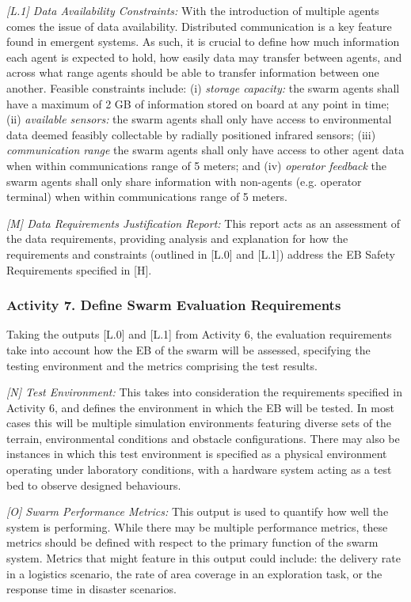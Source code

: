 \documentclass[runningheads]{llncs}
\begin{document}
\emph{[L.1] Data Availability Constraints:}
With the introduction of multiple agents comes the issue of data availability. Distributed communication is a key feature found in emergent systems. As such, it is crucial to define how much information each agent is expected to hold, how easily data may transfer between agents, and across what range agents should be able to transfer information between one another. Feasible constraints include: (i) \emph{storage capacity: }the swarm agents shall have a maximum of 2 GB of information stored on board at any point in time; (ii) \emph{available sensors:} the swarm agents shall only have access to environmental data deemed feasibly collectable by radially positioned infrared sensors; (iii) \emph{communication range} the swarm agents shall only have access to other agent data when within communications range of 5 meters; and (iv) \emph{operator feedback} the swarm agents shall only share information with non-agents (e.g. operator terminal) when within communications range of 5 meters.

\emph{[M] Data Requirements Justification Report:}
This report acts as an assessment of the data requirements, providing analysis and explanation for how the requirements and constraints (outlined in [L.0] and [L.1]) address the EB Safety Requirements specified in [H].

\subsubsection*{Activity 7. Define Swarm Evaluation Requirements}

Taking the outputs [L.0] and [L.1] from Activity 6, the evaluation requirements take into account how the EB of the swarm will be assessed, specifying the testing environment and the metrics comprising the test results.  

\emph{[N] Test Environment:} This takes into consideration the requirements specified in Activity 6, and defines the environment in which the EB will be tested. In most cases this will be multiple simulation environments featuring diverse sets of the terrain, environmental conditions and obstacle configurations. There may also be instances in which this test environment is specified as a physical environment operating under laboratory conditions, with a hardware system acting as a test bed to observe designed behaviours.

\emph{[O] Swarm Performance Metrics:} This output is used to quantify how well the system is performing. While there may be multiple performance metrics, these metrics should be defined with respect to the primary function of the swarm system. Metrics that might feature in this output could include: the delivery rate in a logistics scenario, the rate of area coverage in an exploration task, or the response time in disaster scenarios.
\end{document}
